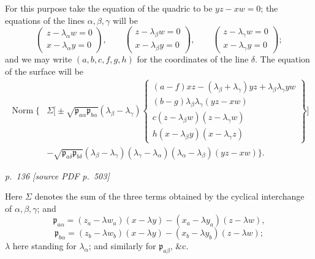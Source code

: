 \documentclass[11pt,a4paper]{article}
\newcommand{\sourcepage}[2]{%
  \bigskip
  \noindent\textit{p.~#1 [source PDF p.~#2]}%
  \par\smallskip
}
\newcommand{\p}{\mathfrak p}
\newcommand{\Norm}{\operatorname{Norm}}
\begin{document}
For this purpose take the equation of the quadric to be $yz-xw=0$; the equations
of the lines $\alpha,\beta,\gamma$ will be
\[
\left(\begin{array}{c}
z-\lambda_\alpha w=0\\
x-\lambda_\alpha y=0
\end{array}\right),\qquad
\left(\begin{array}{c}
z-\lambda_\beta w=0\\
x-\lambda_\beta y=0
\end{array}\right),\qquad
\left(\begin{array}{c}
z-\lambda_\gamma w=0\\
x-\lambda_\gamma y=0
\end{array}\right);
\]
and we may write $(a,b,c,f,g,h)$ for the coordinates of the line $\delta$. The
equation of the surface will be
\[
\begin{aligned}
\Norm\Bigg\{&
\Sigma\Bigg[\pm\sqrt{\p_{a\alpha}\p_{b\alpha}}
(\lambda_\beta-\lambda_\gamma)
\left\{
\begin{array}{l}
(a-f)xz-(\lambda_\beta+\lambda_\gamma)yz+\lambda_\beta\lambda_\gamma yw\\
(b-g)\lambda_\beta\lambda_\gamma(yz-xw)\\
c(z-\lambda_\beta w)(z-\lambda_\gamma w)\\
h(x-\lambda_\beta y)(x-\lambda_\gamma z)
\end{array}\right\}\Bigg]\\
&-\sqrt{\p_{a\delta}\p_{b\delta}}
(\lambda_\beta-\lambda_\gamma)(\lambda_\gamma-\lambda_\alpha)
(\lambda_\alpha-\lambda_\beta)(yz-xw)\Bigg\}.
\end{aligned}
\]

\sourcepage{136}{503}
Here $\Sigma$ denotes the sum of the three terms obtained by the cyclical interchange
of $\alpha,\beta,\gamma$; and
\[
\p_{a\alpha}=(z_a-\lambda w_a)(x-\lambda y)
-(x_a-\lambda y_a)(z-\lambda w),
\]
\[
\p_{b\alpha}=(z_b-\lambda w_b)(x-\lambda y)
-(x_b-\lambda y_b)(z-\lambda w);
\]
$\lambda$ here standing for $\lambda_\alpha$; and similarly for $\p_{a\beta}$, \&c.
\end{document}
